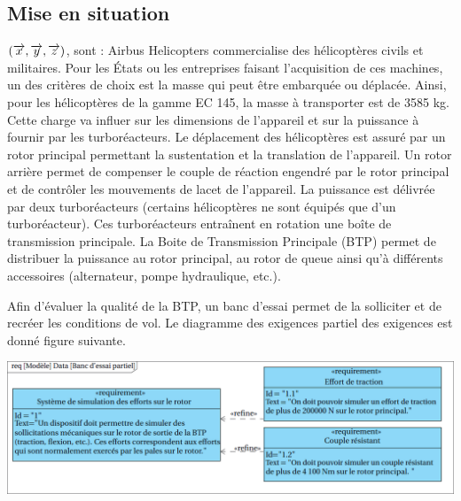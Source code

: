 \documentclass[10pt,fleqn]{article} %
\begin{document}

\vspace{4.5cm}
\pagestyle{fancy}
\thispagestyle{plain}


\def\columnseprulecolor{\color{ocre}}
\setlength{\columnseprule}{0.4pt} 

\begin{multicols}{2}
\section*{Mise en situation}

$\left(\overrightarrow{x},\overrightarrow{y},\overrightarrow{z}\right)$, sont :
\footnotesize
Airbus Helicopters commercialise des hélicoptères civils et militaires. Pour les États ou les entreprises faisant l’acquisition de ces machines, un des critères de choix est la masse qui
peut être embarquée ou déplacée. Ainsi, pour
les hélicoptères de la gamme EC 145, la masse
à transporter est de 3585 kg. Cette charge va
influer sur les dimensions de l’appareil et sur
la puissance à fournir par les turboréacteurs.
Le déplacement des hélicoptères est assuré
par un rotor principal permettant la sustentation
et la translation de l’appareil. Un rotor
arrière permet de compenser le couple de réaction engendré par le rotor principal et
de contrôler les mouvements de lacet de l’appareil. La puissance est délivrée par deux
turboréacteurs (certains hélicoptères ne sont équipés que d’un turboréacteur). Ces
turboréacteurs entraînent en rotation une boîte de transmission principale.
La Boite de Transmission Principale (BTP) permet de distribuer la puissance au
rotor principal, au rotor de queue ainsi qu’à différents accessoires (alternateur, pompe
hydraulique, etc.).



Afin d’évaluer la qualité de la BTP, un banc d’essai permet de la
solliciter et de recréer les conditions de vol. Le diagramme des exigences partiel des exigences est donné figure suivante.


\begin{center}
\includegraphics[width=\linewidth]{images/fig_02}
\end{center}


\end{multicols}
\end{document}
